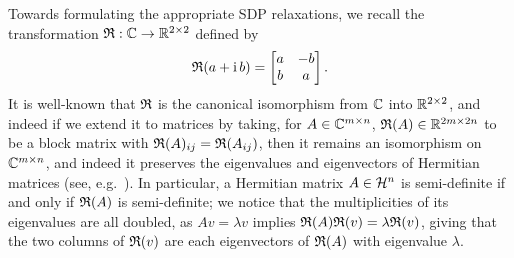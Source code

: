 Towards formulating the appropriate SDP relaxations, we recall the transformation $\mathfrak{R} : \mathbb{C} \to \mathbb{R}^{2 \times 2}$ %
defined by \[\mathfrak{R}(a + \mathrm{i}\, b) = \begin{bmatrix} a & -b \\ b & a \end{bmatrix}.\]
It is well-known that $\mathfrak{R}$ is the canonical isomorphism from $\mathbb{C}$ into $\mathbb{R}^{2 \times 2}$, and indeed if we extend it to matrices by taking, for $A \in \mathbb{C}^{m \times n}$, $\mathfrak{R}(A) \in \mathbb{R}^{2m \times 2n}$ to be a block matrix with $\mathfrak{R}(A)_{ij} = \mathfrak{R}(A_{ij})$, then it remains an isomorphism on $\mathbb{C}^{m \times n}$, and indeed it preserves the eigenvalues and eigenvectors of Hermitian matrices (see, e.g.~\cite[p.~101]{wedderburn1934matrices}).  In particular, a Hermitian matrix $A \in \mathcal{H}^n$ is semi-definite if and only if $\mathfrak{R}(A)$ is semi-definite; we notice that the multiplicities of its eigenvalues are all doubled, as $A v = \lambda v$ implies $\mathfrak{R}(A) \mathfrak{R}(v) = \lambda \mathfrak{R}(v)$, giving that the two columns of $\mathfrak{R}(v)$ are each eigenvectors of $\mathfrak{R}(A)$ with eigenvalue $\lambda$.

